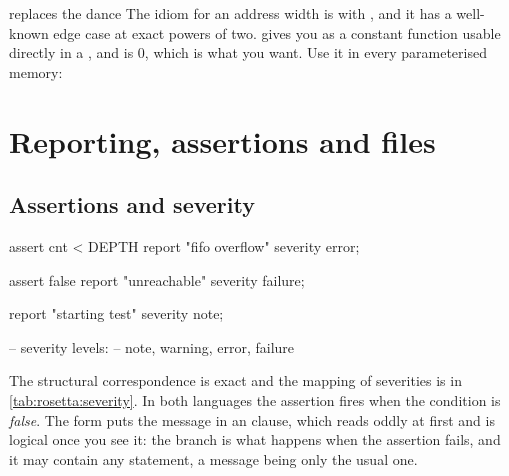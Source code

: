 \begin{tipbox}{ replaces the  dance}
The \VHDL{} idiom for an address width is
 with ,
and it has a well-known edge case at exact powers of two. \SV{} gives you
 as a constant function usable directly in a
, and  is 0, which is what you want. Use it in
every parameterised memory:
\end{tipbox}

\section{Reporting, assertions and files}
\label{sec:rosetta:report}

\subsection{Assertions and severity}

\begin{rosetta}
\begin{rleft}
assert cnt < DEPTH
  report "fifo overflow"
  severity error;

assert false
  report "unreachable"
  severity failure;

report "starting test"
  severity note;

-- severity levels:
--   note, warning, error, failure
\end{rleft}
\end{rosetta}


The structural correspondence is exact and the mapping of severities is in
\cref{tab:rosetta:severity}. In both languages the assertion fires when the
condition is \emph{false}. The \SV{} form puts the message in an 
clause, which reads oddly at first and is logical once you see it: the
 branch is what happens when the assertion fails, and it may contain
any statement, a message being only the usual one.

